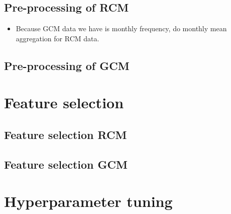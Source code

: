 \documentclass[a4paper,11pt,oneside]{report}
\begin{document}
\section{Pre-processing of RCM}
\begin{itemize}
    \item  Because GCM data we have is monthly frequency, do monthly mean aggregation for RCM data.

\end{itemize}
\section{Pre-processing of GCM}
\chapter{Feature selection}
\section{Feature selection RCM}
\section{Feature selection GCM}

\chapter{Hyperparameter tuning}


%
\end{document}
